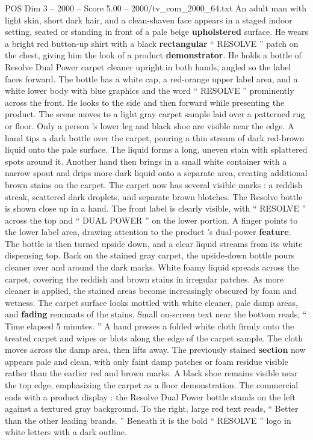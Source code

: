 \begin{textsample}{POS Dim 3 – 2000 – Score 5.00 – 2000/tv\_com\_2000\_64.txt}  \label{ex:f3_pos_065}
An adult man with light skin, short dark hair, and a clean-shaven face appears in a staged indoor setting, seated or standing in front of a pale beige \textbf{upholstered} surface.
He wears a bright red button-up shirt with a black \textbf{rectangular} “ RESOLVE ” patch on the chest, giving him the look of a product \textbf{demonstrator}.
He holds a bottle of Resolve Dual Power carpet cleaner upright in both hands, angled so the label faces forward.
The bottle has a white cap, a red-orange upper label area, and a white lower body with blue graphics and the word “ RESOLVE ” prominently across the front.
He looks to the side and then forward while presenting the product.
The scene moves to a light gray carpet sample laid over a patterned rug or floor.
Only a person ’s lower leg and black shoe are visible near the edge.
A hand tips a dark bottle over the carpet, pouring a thin stream of dark red-brown liquid onto the pale surface.
The liquid forms a long, uneven stain with splattered spots around it.
Another hand then brings in a small white container with a narrow spout and drips more dark liquid onto a separate area, creating additional brown stains on the carpet.
The carpet now has several visible marks : a reddish streak, scattered dark droplets, and separate brown blotches.
The Resolve bottle is shown close up in a hand.
The front label is clearly visible, with “ RESOLVE ” across the top and “ DUAL POWER ” on the lower portion.
A finger points to the lower label area, drawing attention to the product ’s dual-power \textbf{feature}.
The bottle is then turned upside down, and a clear liquid streams from its white dispensing top.
Back on the stained gray carpet, the upside-down bottle pours cleaner over and around the dark marks.
White foamy liquid spreads across the carpet, covering the reddish and brown stains in irregular patches.
As more cleaner is applied, the stained areas become increasingly obscured by foam and wetness.
The carpet surface looks mottled with white cleaner, pale damp areas, and \textbf{fading} remnants of the stains.
Small on-screen text near the bottom reads, “ Time elapsed 5 minutes. ” A hand presses a folded white cloth firmly onto the treated carpet and wipes or blots along the edge of the carpet sample.
The cloth moves across the damp area, then lifts away.
The previously stained \textbf{section} now appears pale and clean, with only faint damp patches or foam residue visible rather than the earlier red and brown marks.
A black shoe remains visible near the top edge, emphasizing the carpet as a floor demonstration.
The commercial ends with a product display : the Resolve Dual Power bottle stands on the left against a textured gray background.
To the right, large red text reads, “ Better than the other leading brands. ” Beneath it is the bold “ RESOLVE ” logo in white letters with a dark outline.

\end{textsample}

